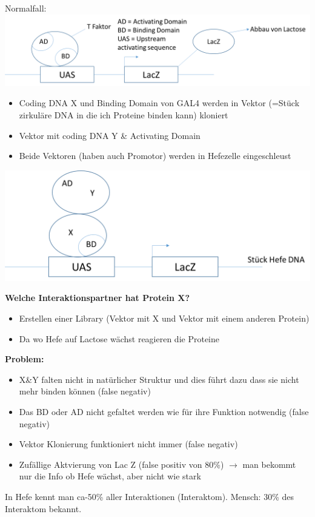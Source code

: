 Normalfall:\\
\includegraphics[width=1\textwidth]{lectures/160429/pix/ppi1.png}
\begin{itemize}
	\item Coding DNA X und Binding Domain von GAL4 werden in Vektor (=Stück zirkuläre DNA in die ich Proteine binden kann) kloniert
	\item Vektor mit coding DNA Y \& Activating Domain
	\item Beide Vektoren (haben auch Promotor) werden in Hefezelle eingeschleust
\end{itemize}

\includegraphics[width=1\textwidth]{lectures/160429/pix/ppi2.png}

\textbf{Welche Interaktionspartner hat Protein X?}
\begin{itemize}
	\item Erstellen einer Library (Vektor mit X und Vektor mit einem anderen Protein)
	\item Da wo Hefe auf Lactose wächst reagieren die Proteine
\end{itemize}

\textbf{Problem:}
\begin{itemize}
	\item X\&Y falten nicht in natürlicher Struktur und dies führt dazu dass sie nicht mehr binden können (false negativ)
	\item Das BD oder AD nicht gefaltet werden wie für ihre Funktion notwendig (false negativ)
	\item Vektor Klonierung funktioniert nicht immer (false negativ)
	\item Zufällige Aktvierung von Lac Z (false positiv von 80\%) $\rightarrow$ man bekommt nur die Info ob Hefe wächst, aber nicht wie stark
\end{itemize}

In Hefe kennt man ca-50\% aller Interaktionen (Interaktom). Mensch: 30\% des Interaktom bekannt.